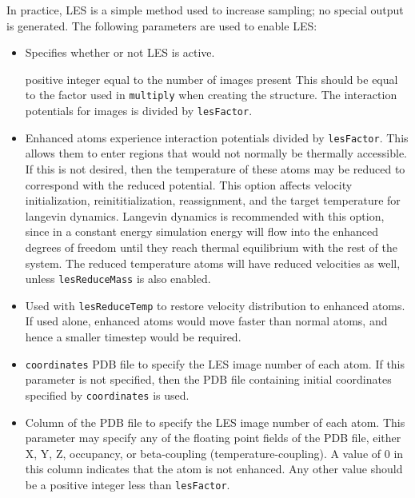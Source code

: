 In practice, LES is a simple method used to increase sampling;
no special output is generated.
The following parameters are used to enable LES:

\begin{itemize}

\item
{}
{Specifies whether or not LES is active.}

{positive integer equal to the number of images present}
{This should be equal to the factor used in {\tt multiply}
 when creating the structure.  The interaction potentials for images is
 divided by {\tt lesFactor}.  
}

\item
{}
{Enhanced atoms experience interaction potentials divided by {\tt lesFactor}.
This allows them to enter regions that would not normally be thermally
accessible.  If this is not desired, then the temperature of these atoms
may be reduced to correspond with the reduced potential.  This option
affects velocity initialization, reinititialization, reassignment, and
the target temperature for langevin dynamics.  Langevin dynamics is
recommended with this option, since in a constant energy simulation energy
will flow into the enhanced degrees of freedom until they reach thermal
equilibrium with the rest of the system.  The reduced temperature atoms
will have reduced velocities as well, unless {\tt lesReduceMass} is also
enabled.}

\item
{}
{Used with {\tt lesReduceTemp} to restore velocity distribution to
enhanced atoms.  If used alone, enhanced atoms would move faster than
normal atoms, and hence a smaller timestep would be required.}

\item
{} {{\tt coordinates}}
{PDB file to specify the LES image number of each atom.
If this parameter is not specified, then 
the PDB file containing initial coordinates specified by 
{\tt coordinates} is used.}

\item
{}
{Column of the PDB file to specify the LES image number of each atom.
This parameter may specify any of the floating point fields of the PDB file, 
either X, Y, Z, occupancy, or beta-coupling (temperature-coupling).  
A value of 0 in this column indicates that the atom is not enhanced.
Any other value should be a positive integer less than {\tt lesFactor}.}

\end{itemize}


